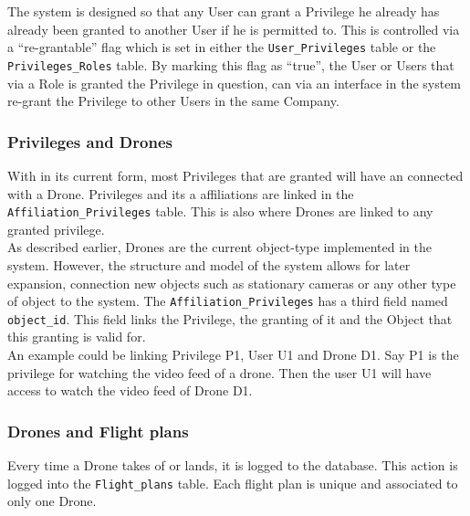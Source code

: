 The system is designed so that any User can grant a Privilege he already has already been granted to another User if he is permitted to.
This is controlled via a ``re-grantable'' flag which is set in either the \verb+User_Privileges+ table or the \verb+Privileges_Roles+ table.
By marking this flag as ``true'', the User or Users that via a Role is granted the Privilege in question, can via an interface in the system re-grant the Privilege to other Users in the same Company.




\subsubsection*{Privileges and Drones}
With \projectname{} in its current form, most Privileges that are granted will have an connected with a Drone.
Privileges and its a affiliations are linked in the \verb+Affiliation_Privileges+ table.
This is also where Drones are linked to any granted privilege. \\

As described earlier, Drones are the current object-type implemented in the system.
However, the structure and model of the system allows for later expansion, connection new objects such as stationary cameras or any other type of object to the system.
The \verb+Affiliation_Privileges+ has a third field named \verb+object_id+.
This field links the Privilege, the granting of it and the Object that this granting is valid for. \\

An example could be linking Privilege P1, User U1 and Drone D1.
Say P1 is the privilege for watching the video feed of a drone.
Then the user U1 will have access to watch the video feed of Drone D1.


\subsubsection*{Drones and Flight plans}
Every time a Drone takes of or lands, it is logged to the database.
This action is logged into the \verb+Flight_plans+ table.
Each flight plan is unique and associated to only one Drone. \\

